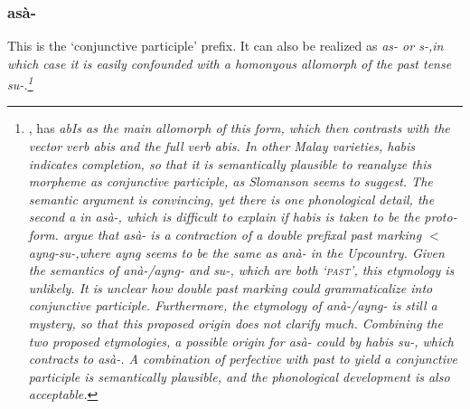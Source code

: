 \\ 

 \\ 
  

 \\
 

\subsubsection{asà-}\label{sec:morph:asa-}
This is the `conjunctive participle' prefix. It can also be realized as \em as- \em or \em s-,\em in which case it is easily confounded with a homonyous allomorph of the past tense \em su-\em.\footnote{ \citet[144]{Slomanson2007cll}, \citet{Slomanson2008lingua} has \em abIs \em as the main allomorph of this form, which then contrasts with the vector verb \em abis \em and the full verb \em abis\em. In other Malay varieties, \em habis \em indicates completion, so that it is semantically plausible to reanalyze this morpheme as conjunctive participle, as Slomanson seems to suggest. The semantic argument is convincing, yet there is one phonological detail, the second \em a \em in \em asà-\em, which is difficult to explain if \em habis \em is taken to be the proto-form.  \citet[167]{SmithEtAl2007} argue that \em asà- \em is a contraction of a double prefixal past marking $<$ \em ayng-su-,\em where \em ayng \em seems to be the same as \em anà- \em in the Upcountry. Given the semantics of \em anà-/ayng- \em and \em su-\em, which are both `\textsc{past}', this etymology is unlikely. It is unclear how double past marking could grammaticalize into conjunctive participle. Furthermore, the etymology of \em anà-/ayng- \em is still a mystery, so that this proposed origin does not clarify much. Combining the two proposed etymologies, a possible origin for \em asà- \em could by \em *habis su-\em, which contracts to \em asà-\em. A combination of perfective with past to yield a conjunctive participle is semantically plausible, and the phonological development is also acceptable.}

